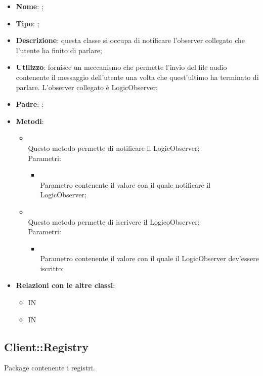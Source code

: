 \begin{itemize}
	\item \textbf{Nome}: ;
	\item \textbf{Tipo}: ;
	\item \textbf{Descrizione}: questa classe si occupa di notificare l'observer collegato che l'utente ha finito di parlare;
	\item \textbf{Utilizzo}: fornisce un meccanismo che permette l'invio del file audio contenente il messaggio dell'utente una volta che quest'ultimo ha terminato di parlare.
L'observer collegato è LogicObserver;
	\item \textbf{Padre}: ;
	\item \textbf{Metodi}:
	\begin{itemize}
		\item[]  \\
		Questo metodo permette di notificare il LogicObserver;\\
		Parametri:
		\begin{itemize}
			\item {} \\
			Parametro contenente il valore con il quale notificare il LogicObserver;
		\end{itemize}
		\item[]  \\
		Questo metodo permette di iscrivere il LogicoObserver;\\
		Parametri:
		\begin{itemize}
			\item {} \\
			Parametro contenente il valore con il quale il LogicObserver dev'essere iscritto;
		\end{itemize}
	\end{itemize}
	\item \textbf{Relazioni con le altre classi}:
	\begin{itemize}
		\item IN \hyperlink{Recorder_label}{}
		\item IN \hyperlink{SpeechEndObservable_label}{}
	\end{itemize}
\end{itemize}

\subsection{Client::Registry}
Package contenente i registri.

